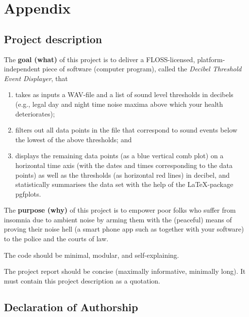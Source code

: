 \section{Appendix}

\subsection{Project description}

The \textbf{goal (what)} of this project is to deliver a FLOSS-licensed, platform-independent piece of
software (computer program), called the \textit{Decibel Threshold Event Displayer}, that

\begin{enumerate}
    \item takes as inputs a WAV-file and a list of sound level thresholds in decibels (e.g., legal day
    and night time noise maxima above which your health deteriorates);
    \item filters out all data points in the file that correspond to sound events below the lowest of
    the above thresholds; and
    \item displays the remaining data points (as a blue vertical comb plot) on a horizontal time
    axis (with the dates and times corresponding to the data points) as well as the
    thresholds (as horizontal red lines) in decibel, and statistically summarises the data set
    with the help of the LaTeX-package pgfplots.
\end{enumerate}

The \textbf{purpose (why)} of this project is to empower poor folks who suffer from insomnia due to
ambient noise by arming them with the (peaceful) means of proving
their noise hell (a smart phone app such as together with your software) to the police and the courts of
law. \newline

The code should be minimal, modular, and self-explaining. \newline

The project report should be concise (maximally informative, minimally long). It must contain
this project description as a quotation.

\subsection{Declaration of Authorship}